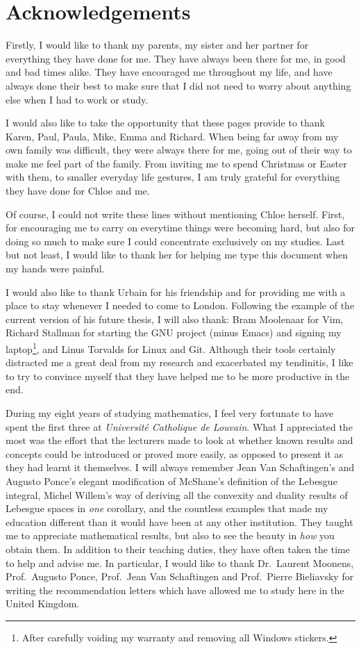 \chapter*{Acknowledgements}

Firstly, I would like to thank my parents, my sister and her partner for everything they have done for me.
They have always been there for me,
in good and bad times alike.
They have encouraged me throughout my life,
and have always done their best to make sure that I did not need to worry about anything else when I had to work or study.

I would also like to take the opportunity that these pages provide to thank Karen, Paul, Paula, Mike, Emma and Richard.
When being far away from my own family was difficult,
they were always there for me, going out of their way to make me feel part of the family.
From inviting me to spend Christmas or Easter with them,
to smaller everyday life gestures,
I am truly grateful for everything they have done for Chloe and me.

Of course,
I could not write these lines without mentioning Chloe herself.
First, for encouraging me to carry on everytime things were becoming hard,
but also for doing so much to make sure I could concentrate exclusively on my studies.
Last but not least,
I would like to thank her for helping me type this document
when my hands were painful.

I would also like to thank Urbain for his friendship and for providing me with a place to stay whenever I needed to come to London.
Following the example of the current version of his future thesis,
I will also thank:
Bram Moolenaar for Vim,
Richard Stallman for starting the GNU project (minus Emacs) and signing my laptop\footnote{After carefully voiding my warranty and removing all Windows stickers.},
and Linus Torvalds for Linux and Git.
Although their tools certainly distracted me a great deal from my research
and exacerbated my tendinitis,
I like to try to convince myself that they have helped me to be more productive in the end.

During my eight years of studying mathematics,
I feel very fortunate to have spent the first three at \emph{Universit\'e Catholique de Louvain}.
What I appreciated the most was the effort that the lecturers made to look at
whether known results and concepts could be introduced or proved more easily,
as opposed to present it as they had learnt it themselves.
I will always remember Jean Van Schaftingen's and Augusto Ponce's elegant modification of McShane's definition of the Lebesgue integral,
Michel Willem's way of deriving all the convexity and duality results of Lebesgue spaces in \emph{one} corollary,
and the countless examples that made my education different than it would have been at any other institution.
They taught me to appreciate mathematical results,
but also to see the beauty in \emph{how} you obtain them.
In addition to their teaching duties,
they have often taken the time to help and advise me.
In particular,
I would like to thank Dr.\ Laurent Moonens,
Prof.\ Augusto Ponce, Prof.\ Jean Van Schaftingen and Prof.\ Pierre Bieliavsky for writing the recommendation letters which have allowed me to study here in the United Kingdom.

